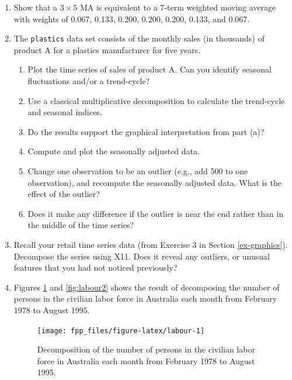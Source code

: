 \documentclass[]{book}
\providecommand{\tightlist}{%
  \setlength{\itemsep}{0pt}\setlength{\parskip}{0pt}}
\begin{document}
\begin{enumerate}
\def\labelenumi{\arabic{enumi}.}
\item
  Show that a \(3\times5\) MA is equivalent to a 7-term weighted moving average with weights of 0.067, 0.133, 0.200, 0.200, 0.200, 0.133, and 0.067.
\item
  The \texttt{plastics} data set consists of the monthly sales (in thousands) of product A for a plastics manufacturer for five years.

  \begin{enumerate}
  \def\labelenumii{(\alph{enumii})}
  \tightlist
  \item
    Plot the time series of sales of product A. Can you identify seasonal fluctuations and/or a trend-cycle?
  \item
    Use a classical multiplicative decomposition to calculate the trend-cycle and seasonal indices.
  \item
    Do the results support the graphical interpretation from part (a)?
  \item
    Compute and plot the seasonally adjusted data.
  \item
    Change one observation to be an outlier (e.g., add 500 to one observation), and recompute the seasonally adjusted data. What is the effect of the outlier?
  \item
    Does it make any difference if the outlier is near the end rather than in the middle of the time series?
  \end{enumerate}
\item
  Recall your retail time series data (from Exercise 3 in Section \ref{ex-graphics}).
  Decompose the series using X11. Does it reveal any outliers, or unusual features that you had not noticed previously?
\item
  Figures \ref{fig:labour} and \ref{fig:labour2} shows the result of decomposing the number of persons in the civilian labor force in Australia each month from February 1978 to August 1995.

  \begin{figure}

   {\centering \texttt{[image: fpp\_files/figure-latex/labour-1]} 

   }

   \caption{Decomposition of the number of persons in the civilian labor force in Australia each month from February 1978 to August 1995.}\label{fig:labour}
   \end{figure}

  \begin{figure}


\end{figure}
\end{enumerate}
\end{document}
